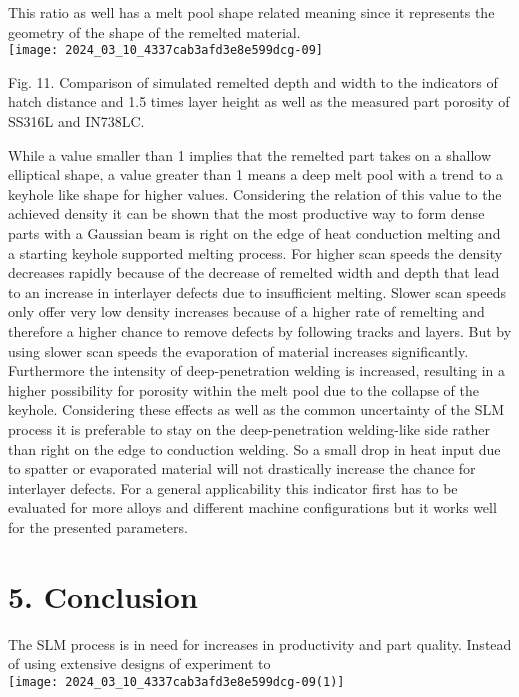 \documentclass[10pt]{article}
\begin{document}
This ratio as well has a melt pool shape related meaning since it represents the geometry of the shape of the remelted material.\\
\texttt{[image: 2024\_03\_10\_4337cab3afd3e8e599dcg-09]}

Fig. 11. Comparison of simulated remelted depth and width to the indicators of hatch distance and 1.5 times layer height as well as the measured part porosity of SS316L and IN738LC.

While a value smaller than 1 implies that the remelted part takes on a shallow elliptical shape, a value greater than 1 means a deep melt pool with a trend to a keyhole like shape for higher values. Considering the relation of this value to the achieved density it can be shown that the most productive way to form dense parts with a Gaussian beam is right on the edge of heat conduction melting and a starting keyhole supported melting process. For higher scan speeds the density decreases rapidly because of the decrease of remelted width and depth that lead to an increase in interlayer defects due to insufficient melting. Slower scan speeds only offer very low density increases because of a higher rate of remelting and therefore a higher chance to remove defects by following tracks and layers. But by using slower scan speeds the evaporation of material increases significantly. Furthermore the intensity of deep-penetration welding is increased, resulting in a higher possibility for porosity within the melt pool due to the collapse of the keyhole. Considering these effects as well as the common uncertainty of the SLM process it is preferable to stay on the deep-penetration welding-like side rather than right on the edge to conduction welding. So a small drop in heat input due to spatter or evaporated material will not drastically increase the chance for interlayer defects. For a general applicability this indicator first has to be evaluated for more alloys and different machine configurations but it works well for the presented parameters.

\section*{5. Conclusion}
The SLM process is in need for increases in productivity and part quality. Instead of using extensive designs of experiment to\\
\texttt{[image: 2024\_03\_10\_4337cab3afd3e8e599dcg-09(1)]}
\end{document}
